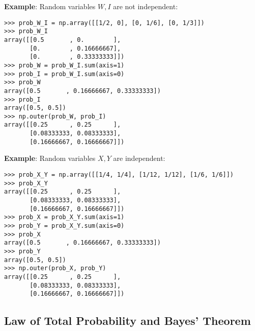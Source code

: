 \begin{paracol}{2}

\textbf{Example}: Random variables $W, I$ are not independent:

\begin{verbatim}
>>> prob_W_I = np.array([[1/2, 0], [0, 1/6], [0, 1/3]])
>>> prob_W_I
array([[0.5       , 0.        ],
       [0.        , 0.16666667],
       [0.        , 0.33333333]])
>>> prob_W = prob_W_I.sum(axis=1)
>>> prob_I = prob_W_I.sum(axis=0)
>>> prob_W
array([0.5       , 0.16666667, 0.33333333])
>>> prob_I
array([0.5, 0.5])
>>> np.outer(prob_W, prob_I)
array([[0.25      , 0.25      ],
       [0.08333333, 0.08333333],
       [0.16666667, 0.16666667]])
\end{verbatim}

\switchcolumn

\textbf{Example}: Random variables $X, Y$ are independent:

\begin{verbatim}
>>> prob_X_Y = np.array([[1/4, 1/4], [1/12, 1/12], [1/6, 1/6]])
>>> prob_X_Y
array([[0.25      , 0.25      ],
       [0.08333333, 0.08333333],
       [0.16666667, 0.16666667]])
>>> prob_X = prob_X_Y.sum(axis=1)
>>> prob_Y = prob_X_Y.sum(axis=0)
>>> prob_X
array([0.5       , 0.16666667, 0.33333333])
>>> prob_Y
array([0.5, 0.5])
>>> np.outer(prob_X, prob_Y)
array([[0.25      , 0.25      ],
       [0.08333333, 0.08333333],
       [0.16666667, 0.16666667]])
\end{verbatim}

\end{paracol}

\subsection{Law of Total Probability and Bayes' Theorem}

